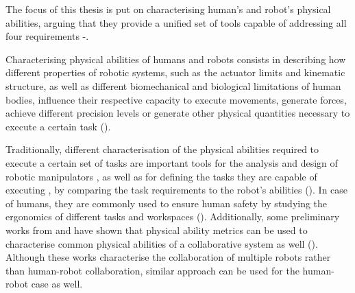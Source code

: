


The focus of this thesis is put on characterising human's and robot's physical abilities, arguing that they provide a unified set of tools capable of addressing all four requirements -.

Characterising physical abilities of humans and robots consists in describing how different properties of robotic systems, such as the actuator limits and kinematic structure, as well as different biomechanical and biological limitations of human bodies, influence their respective capacity to execute movements, generate forces, achieve different precision levels or generate other physical quantities necessary to execute a certain task ().

Traditionally, different characterisation of the physical abilities required to execute a certain set of tasks are important tools for the analysis and design of robotic manipulators \cite{patel2015manipulator}, as well as for defining the tasks they are capable of executing \cite{Pholsiri2015task}, by comparing the task requirements to the robot's abilities (). In case of humans, they are commonly used to ensure human safety by studying the ergonomics of different tasks and workspaces \cite{Golabchi2015} (). Additionally, some preliminary works from \citet{chiacchio_global_1991} and \citet{lee2001velocity} have shown that physical ability metrics can be used to characterise common physical abilities of a collaborative system as well (). Although these works characterise the collaboration of multiple robots rather than human-robot collaboration, similar approach can be used for the human-robot case as well.

